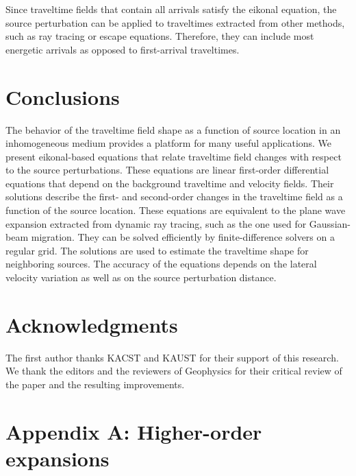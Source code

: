  Since traveltime fields that contain all arrivals satisfy the eikonal
 equation, the source perturbation can be applied to traveltimes
 extracted from other methods, such as ray tracing or escape
 equations. Therefore, they can include most energetic arrivals as
 opposed to first-arrival traveltimes.


\section{Conclusions}

The behavior of the traveltime field shape as a function of source
location in an inhomogeneous medium provides a platform for many
useful applications. We present eikonal-based equations that relate
traveltime field changes with respect to the source perturbations.
These equations are linear first-order differential equations that
depend on the background traveltime and velocity fields.  Their
solutions describe the first- and second-order changes in the
traveltime field as a function of the source location. These equations
are equivalent to the plane wave expansion extracted from dynamic ray
tracing, such as the one used for Gaussian-beam migration.  They can
be solved efficiently by finite-difference solvers on a regular grid.
The solutions are used to estimate the traveltime shape for
neighboring sources.  The accuracy of the equations depends on the
 lateral velocity variation 
as well as on the source perturbation distance.

\section{Acknowledgments}
The first author thanks KACST and KAUST for their
support of this research. We thank the editors and the 
reviewers of Geophysics for their critical review of the paper and the resulting improvements.




\appendix
\section{Appendix A: Higher-order expansions}

